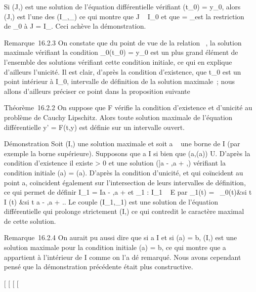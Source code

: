 \documentclass[]{article}
\begin{document}
Si (J,\psi) est une solution de l'équation différentielle vérifiant
\psi(t\_0) = y\_0, alors (J,\psi) est l'une des
(I\_\jmath,\psi\_\jmath) ce qui montre que J \subset~ I\_0 et que \psi
= \psi\_\jmath est la restriction de \phi\_0 à J = I\_\jmath.
Ceci achève la démonstration.

Remarque~16.2.3 On constate que du point de vue de la relation \prec~, la
solution maximale vérifiant la condition \phi\_0(t\_0) =
y\_0 est un plus grand élément de l'ensemble des solutions
vérifiant cette condition initiale, ce qui en explique d'ailleurs
l'unicité. Il est clair, d'après la condition d'existence, que
t\_0 est un point intérieur à I\_0, intervalle de
définition de la solution maximale~; nous allons d'ailleurs préciser ce
point dans la proposition suivante

Théorème~16.2.2 On suppose que F vérifie la condition d'existence et
d'unicité au problème de Cauchy Lipschitz. Alors toute solution maximale
de l'équation différentielle y' = F(t,y) est définie sur un intervalle
ouvert.

Démonstration Soit (I,\phi) une solution maximale et soit a
\in\overline{}~ une borne de I (par exemple la borne
supérieure). Supposons que a \in I si bien que (a,\phi(a)) \in U. D'après la
condition d'existence il existe \eta \textgreater{} 0 et une solution ({]}a
- \eta,a + \eta{[},\psi) vérifiant la condition initiale \psi(a) = \phi(a). D'après la
condition d'unicité, \phi et \psi qui coïncident au point a, coïncident
également sur l'intersection de leurs intervalles de définition, ce qui
permet de définir I\_1 = I\cup{]}a - \eta,a + \eta{[} et \phi\_1 :
I\_1 \rightarrow~ E par \phi\_1(t) = \left
\ \cases \phi\_0(t)&si t \in I
\cr \psi(t) &si t \in{]}a - \eta,a + \eta{[} 
\right .. Le couple (I\_1,\phi\_1) est une
solution de l'équation différentielle qui prolonge strictement (I,\phi) ce
qui contredit le caractère maximal de cette solution.

Remarque~16.2.4 On aurait pu aussi dire que si a \in I et si \phi(a) = b,
(I,\phi) est une solution maximale pour la condition initiale \phi(a) = b, ce
qui montre que a appartient à l'intérieur de I comme on l'a dé
remarqué. Nous avons cependant pensé que la démonstration précédente
était plus constructive.

{[}
{[}
{[}
{[}
\end{document}
